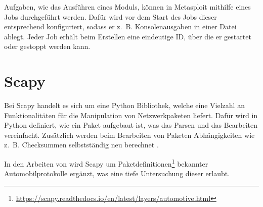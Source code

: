 Aufgaben, wie das Ausführen eines Moduls, können in Metasploit mithilfe eines Jobs durchgeführt werden. Dafür wird vor dem Start des Jobs dieser entsprechend konfiguriert, sodass er z. B. Konsolenausgaben in einer Datei ablegt. Jeder Job erhält beim Erstellen eine eindeutige ID, über die er gestartet oder gestoppt werden kann. 

\section{Scapy}\label{subsec:scapy}
Bei Scapy handelt es sich um eine Python Bibliothek, welche eine Vielzahl an Funktionalitäten für die Manipulation von Netzwerkpaketen liefert. Dafür wird in Python definiert, wie ein Paket aufgebaut ist, was das Parsen und das Bearbeiten vereinfacht. Zusätzlich werden beim Bearbeiten von Paketen Abhängigkeiten wie z. B. Checksummen selbstständig neu berechnet \cite{scappy}.

In den Arbeiten von \cite{scapyAutomotive} wird Scapy um Paketdefinitionen\footnote{\url{https://scapy.readthedocs.io/en/latest/layers/automotive.html}} bekannter Automobilprotokolle ergänzt, was eine tiefe Untersuchung dieser erlaubt.